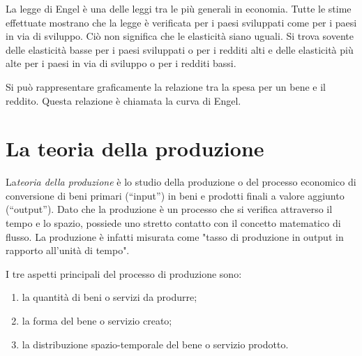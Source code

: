 La legge di Engel è una delle leggi tra le più generali in economia. Tutte 
le stime effettuate mostrano che la legge è verificata per  i paesi 
sviluppati come per i paesi in via di sviluppo. Ciò non significa che le 
elasticità siano uguali. Si trova sovente delle elasticità basse per i paesi 
sviluppati o per i redditi alti e delle elasticità più alte per i paesi in via 
di sviluppo o per i redditi bassi.

Si può rappresentare graficamente la relazione tra la spesa per un bene e il 
reddito. Questa relazione è chiamata la curva di Engel.

% 
% 




\section{La teoria della produzione}



La\emph{teoria della produzione} è lo studio della produzione o del 
processo economico di conversione di beni 
primari (``input'') in beni e prodotti finali a 
valore aggiunto (``output''). Dato che la produzione è un processo che si 
verifica attraverso il tempo e lo spazio, possiede uno stretto contatto con il 
concetto matematico di flusso. La produzione è infatti 
misurata come "tasso di produzione in output in rapporto all'unità di 
tempo".

I tre aspetti principali del processo di produzione sono:
\begin{enumerate} [noitemsep]
 \item la quantità di beni o servizi da produrre;
 \item la forma del bene o servizio creato;
 \item la distribuzione spazio-temporale del bene o servizio prodotto.
\end{enumerate}

